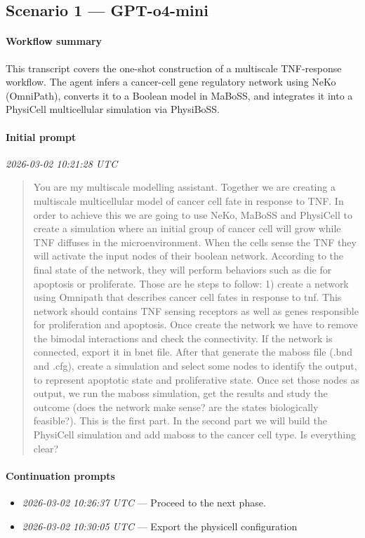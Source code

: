 \subsection{Scenario 1 — GPT-o4-mini}

\paragraph{Workflow summary}
This transcript covers the one-shot construction of a multiscale TNF-response workflow. The agent infers a cancer-cell gene regulatory network using NeKo (OmniPath), converts it to a Boolean model in MaBoSS, and integrates it into a PhysiCell multicellular simulation via PhysiBoSS.

\paragraph{Initial prompt} \hfill \textit{\small 2026-03-02 10:21:28 UTC}
\begin{quote}
You are my multiscale modelling assistant. Together we are creating a multiscale multicellular model of cancer cell fate in response to TNF. In order to achieve this we are going to use NeKo, MaBoSS and PhysiCell to create a simulation where an initial group of cancer cell will grow while TNF diffuses in the microenvironment. When the cells sense the TNF they will activate the input nodes of their boolean network. According to the final state of the network, they will perform behaviors such as die for apoptosis or proliferate. Those are he steps to follow: 1) create a network using Omnipath that describes cancer cell fates in response to tnf. This network should contains TNF sensing receptors as well as genes responsible for proliferation and apoptosis. Once create the network we have to remove the bimodal interactions and check the connectivity. If the network is connected, export it in bnet file. After that generate the maboss file (.bnd and .cfg), create a simulation and select some nodes to identify the output, to represent apoptotic state and proliferative state. Once set those nodes as output, we run the maboss simulation, get the results and study the outcome (does the network make
sense? are the states biologically feasible?). This is the first part. In the second part we will build the PhysiCell simulation and add maboss to the cancer cell type. Is everything clear?
\end{quote}

\paragraph{Continuation prompts}
\begin{itemize}
\item \textit{\small 2026-03-02 10:26:37 UTC} --- Proceed to the next phase.
\item \textit{\small 2026-03-02 10:30:05 UTC} --- Export the physicell configuration
\end{itemize}

